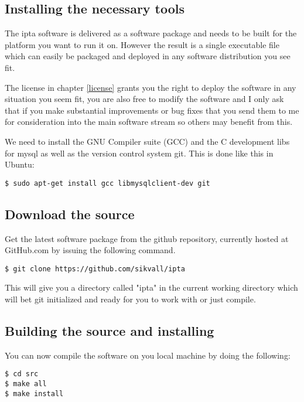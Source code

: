 \documentclass[english,twoside,openright,a4paper,12pt]{article}
\begin{document}
\subsection{Installing the necessary tools}

The ipta software is delivered as a software package and needs to be
built for the platform you want to run it on. However the result is a
single executable file which can easily be packaged and deployed in
any software distribution you see fit.

The license in chapter \ref{license} grants you the right to deploy
the software in any situation you seem fit, you are also free to
modify the software and I only ask that if you make substantial
improvements or bug fixes that you send them to me for consideration
into the main software stream so others may benefit from this.

We need to install the GNU Compiler suite (GCC) and the C development
libs for mysql as well as the version control system git. This is done
like this in Ubuntu:

\begin{verbatim}
$ sudo apt-get install gcc libmysqlclient-dev git
\end{verbatim}

\subsection{Download the source}

Get the latest software package from the github repository, currently
hosted at GitHub.com by issuing the following command.

\begin{verbatim}
$ git clone https://github.com/sikvall/ipta
\end{verbatim}

This will give you a directory called "ipta" in the current working 
directory which will bet git initialized and ready for you to work 
with or just compile.

\subsection{Building the source and installing}

You can now compile the software on you local machine by doing the
following:

\begin{verbatim}
$ cd src 
$ make all 
$ make install
\end{verbatim}
\end{document}
